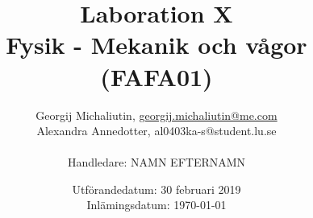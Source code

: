 \title{Laboration X \\ Fysik - Mekanik och vågor (FAFA01)}
\author{Georgij Michaliutin, \href{mailto:georgij.michaliutin@me.com}{georgij.michaliutin@me.com}  \\
Alexandra Annedotter, al0403ka-s@student.lu.se \\ \\ Handledare: NAMN EFTERNAMN}
\date{Utförandedatum: 30 februari 2019 \\ Inlämingsdatum: \today}	